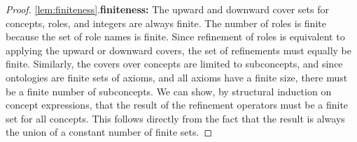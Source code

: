 \begin{proof}
  \item \ref{lem:finiteness}.\enspace \textbf{finiteness:\enspace}
  The upward and downward cover sets for concepts, roles, and integers are always finite. The number of roles is finite because the set of role names is finite. Since refinement of roles is equivalent to applying the upward or downward covers, the set of refinements must equally be finite. Similarly, the covers over concepts are limited to subconcepts, and since ontologies are finite sets of axioms, and all axioms have a finite size, there must be a finite number of subconcepts. We can show, by structural induction on concept expressions, that the result of the refinement operators must be a finite set for all concepts. This follows directly from the fact that the result is always the union of a constant number of finite sets.


\end{proof}
